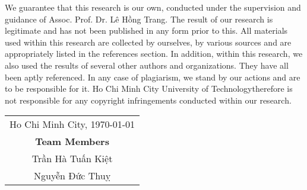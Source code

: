 
\begin{declaration}

    We guarantee that this research is our own, conducted under the supervision
 and guidance of Assoc. Prof. Dr. Lê Hồng Trang. The result of our research is
 legitimate and has not been published in any form prior to this. All materials
 used within this research are collected by ourselves, by various sources and
 are appropriately listed in the references section. In addition, within this
 research, we also used the results of several other authors and organizations.
 They have all been aptly referenced. In any case of plagiarism, we stand by our
 actions and are to be responsible for it. Ho Chi Minh City University of
 Technologytherefore is not responsible for any copyright infringements
 conducted within our research.

    \begin{flushright}

        \begin{tabular}{@{}c@{}} Ho Chi Minh City, \today \\
            \textbf{Team Members}    \\
            Trần Hà Tuấn Kiệt        \\
            Nguyễn Đức Thuỵ
        \end{tabular}

    \end{flushright}
\end{declaration}

\newpage

